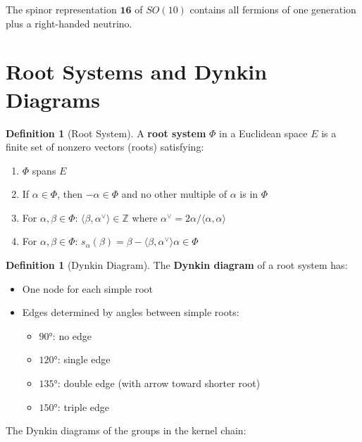 \documentclass[11pt,a4paper,openright]{book}
\theoremstyle{plain}
\theoremstyle{definition}
\newtheorem{definition}[theorem]{Definition}
\newcommand{\Z}{\mathbb{Z}}
\begin{document}
The spinor representation $\mathbf{16}$ of $SO(10)$ contains all fermions of one generation plus a right-handed neutrino.

\section{Root Systems and Dynkin Diagrams}

\begin{definition}[Root System]
A \textbf{root system} $\Phi$ in a Euclidean space $E$ is a finite set of nonzero vectors (roots) satisfying:
\begin{enumerate}[label=(\roman*)]
    \item $\Phi$ spans $E$
    \item If $\alpha \in \Phi$, then $-\alpha \in \Phi$ and no other multiple of $\alpha$ is in $\Phi$
    \item For $\alpha, \beta \in \Phi$: $\langle \beta, \alpha^\vee \rangle \in \Z$ where $\alpha^\vee = 2\alpha/\langle\alpha,\alpha\rangle$
    \item For $\alpha, \beta \in \Phi$: $s_\alpha(\beta) = \beta - \langle\beta,\alpha^\vee\rangle\alpha \in \Phi$
\end{enumerate}
\end{definition}

\begin{definition}[Dynkin Diagram]
The \textbf{Dynkin diagram} of a root system has:
\begin{itemize}
    \item One node for each simple root
    \item Edges determined by angles between simple roots:
    \begin{itemize}
        \item $90°$: no edge
        \item $120°$: single edge
        \item $135°$: double edge (with arrow toward shorter root)
        \item $150°$: triple edge
    \end{itemize}
\end{itemize}
\end{definition}

The Dynkin diagrams of the groups in the kernel chain:
\end{document}

